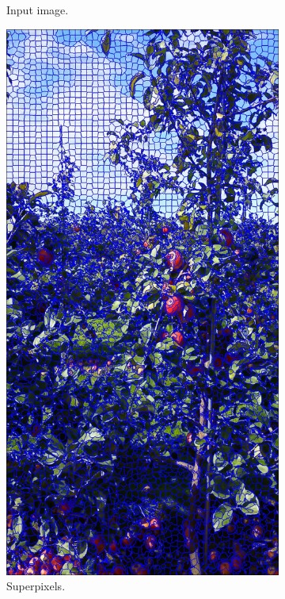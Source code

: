 \begin{figure}[!hbpt]
\begin{subfigure}[b]{.23 \textwidth}
            \caption{Input image.}
             \label{fig:pipe1}
         \end{subfigure}\hspace{.2cm}\begin{subfigure}[b]{.23 \textwidth}
            \includegraphics[width=\textwidth]{figures/detection/pipeline2.jpg}                  
        \caption{Superpixels.}       
        \label{fig:pipe2}        
        \end{subfigure}\hspace{.2cm}\begin{subfigure}[b]{.23 \textwidth}      
        

\end{subfigure}
\end{figure}
